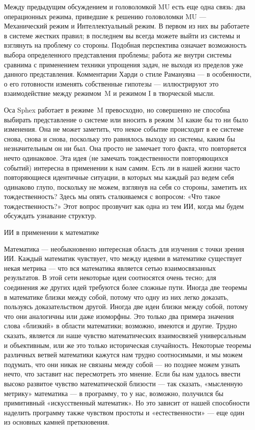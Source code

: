 \documentclass[../main.tex]{subfiles}
\begin{document}
Между предыдущим обсуждением и головоломкой MU есть еще одна связь: два операционных режима, приведшие к решению головоломки MU --- Механический режим и Интеллектуальный режим. В первом из них вы работаете в системе жестких правил; в последнем вы всегда можете выйти из системы и взглянуть на проблему со стороны. Подобная перспектива означает возможность выбора определенного представления проблемы; работа же внутри системы сравнима с применением техники упрощения задач, не выходя из пределов уже данного представления. Комментарии Харди о стиле Рамануяна --- в особенности, о его готовности изменять собственные гипотезы --- иллюстрируют это взаимодействие между режимом~M и режимом I в творческой мысли.

Оса Sphex работает в режиме~M превосходно, но совершенно не способна выбирать представление о системе или вносить в режим~M какие бы то ни было изменения. Она не может заметить, что некое событие происходит в ее системе снова, снова и снова, поскольку это равнялось выходу из системы, каким бы незначительным он ни был. Она просто не замечает того факта, что повторяется нечто одинаковое. Эта идея (не замечать тождественности повторяющихся событий) интересна в применении к нам самим. Есть ли в нашей жизни часто повторяющиеся идентичные ситуации, в которых мы каждый раз ведем себя одинаково глупо, поскольку не можем, взглянув на себя со стороны, заметить их тождественность? Здесь мы опять сталкиваемся с вопросом: «Что такое тождественность?» Этот вопрос прозвучит как одна из тем ИИ, когда мы будем обсуждать узнавание структур.

ИИ в применении к математике

Математика --- необыкновенно интересная область для изучения с точки зрения ИИ. Каждый математик чувствует, что между идеями в математике существует некая метрика --- что вся математика является сетью взаимосвязанных результатов. В этой сети некоторые идеи соотносятся очень тесно; для соединения же других идей требуются более сложные пути. Иногда две теоремы в математике близки между собой, потому что одну из них легко доказать, пользуясь доказательством другой. Иногда две идеи близки между собой, потому что они аналогичны или даже изоморфны. Это только два примера значения слова «близкий» в области математики; возможно, имеются и другие. Трудно сказать, является ли наше чувство математических взаимосвязей универсальным и объективным, или же это только историческая случайность. Некоторые теоремы различных ветвей математики кажутся нам трудно соотносимыми, и мы можем подумать, что они никак не связаны между собой --- но позднее можем узнать нечто, что заставит нас пересмотреть это мнение. Если бы нам удалось ввести высоко развитое чувство математической близости --- так сказать, «мысленную метрику» математика --- в программу, то у нас, возможно, получился бы примитивный «искусственный математик». Но это зависит от нашей способности наделить программу также чувством простоты и «естественности» --- еще один из основных камней преткновения.
\end{document}
